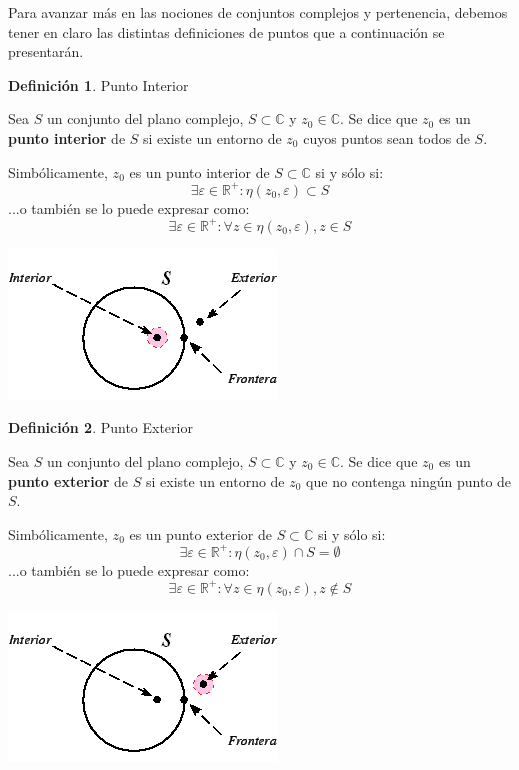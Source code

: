 \documentclass[12pt]{article}
\theoremstyle{definition}
\newtheorem{definition}{Definici\'on}[section]
\begin{document}
Para avanzar m\'as en las nociones de conjuntos complejos y pertenencia, debemos tener en claro las distintas definiciones de puntos que a continuaci\'on se presentar\'an.

\colorbox{yellow!40!white!80}{\parbox{\linewidth}{
\theoremstyle{definition}
\begin{definition} Punto Interior

Sea $S$ un conjunto del plano complejo, $S \subset \mathbb{C}$ y $z_0 \in \mathbb{C}$. Se dice que $z_0$ es un \textbf{punto interior} de $S$ si existe un entorno de $z_0$ cuyos puntos sean todos de $S$.

Simb\'olicamente, $z_0$ es un punto interior de $S \subset \mathbb{C}$ si y s\'olo si:
$$\exists \varepsilon \in \mathbb{R}^+ : \eta(z_0, \varepsilon) \subset S$$
...o tambi\'en se lo puede expresar como:
$$\exists \varepsilon \in \mathbb{R}^+ : \forall z \in \eta(z_0, \varepsilon), z \in S$$
\end{definition}}}

\begin{center}
	\includegraphics[scale=1]{pinterior.png}
\end{center}

\colorbox{yellow!40!white!80}{\parbox{\linewidth}{
\theoremstyle{definition}
\begin{definition} Punto Exterior

Sea $S$ un conjunto del plano complejo, $S \subset \mathbb{C}$ y $z_0 \in \mathbb{C}$. Se dice que $z_0$ es un \textbf{punto exterior} de $S$ si existe un entorno de $z_0$ que no contenga ning\'un punto de $S$.


Simb\'olicamente, $z_0$ es un punto exterior de $S \subset \mathbb{C}$ si y s\'olo si:
$$\exists \varepsilon \in \mathbb{R}^+ : \eta(z_0, \varepsilon) \cap S = \emptyset$$
...o tambi\'en se lo puede expresar como:
$$\exists \varepsilon \in \mathbb{R}^+ : \forall z \in \eta(z_0, \varepsilon), z \notin S$$
\end{definition}}}

\begin{center}
	\includegraphics[scale=1]{pexterior.png}
\end{center}
\end{document}
